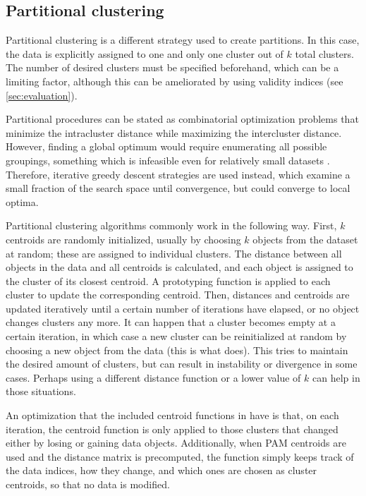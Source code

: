 \subsection{Partitional clustering}
\label{sec:pc}

Partitional clustering is a different strategy used to create partitions.
In this case, the data is explicitly assigned to one and only one cluster out of $k$ total clusters.
The number of desired clusters must be specified beforehand,
which can be a limiting factor,
although this can be ameliorated by using validity indices (see \cref{sec:evaluation}).

Partitional procedures can be stated as combinatorial optimization problems that minimize the intracluster distance while maximizing the intercluster distance.
However, finding a global optimum would require enumerating all possible groupings,
something which is infeasible even for relatively small datasets \citep{hastie2009}.
Therefore, iterative greedy descent strategies are used instead,
which examine a small fraction of the search space until convergence,
but could converge to local optima.

Partitional clustering algorithms commonly work in the following way.
First, $k$ centroids are randomly initialized,
usually by choosing $k$ objects from the dataset at random;
these are assigned to individual clusters.
The distance between all objects in the data and all centroids is calculated,
and each object is assigned to the cluster of its closest centroid.
A prototyping function is applied to each cluster to update the corresponding centroid.
Then, distances and centroids are updated iteratively until a certain number of iterations have elapsed,
or no object changes clusters any more.
It can happen that a cluster becomes empty at a certain iteration,
in which case a new cluster can be reinitialized at random by choosing a new object from the data
(this is what \dtwclust{} does).
This tries to maintain the desired amount of clusters,
but can result in instability or divergence in some cases.
Perhaps using a different distance function or a lower value of $k$ can help in those situations.

An optimization that the included centroid functions in \dtwclust{} have is that,
on each iteration,
the centroid function is only applied to those clusters that changed either by losing or gaining data objects.
Additionally, when PAM centroids are used and the distance matrix is precomputed,
the function simply keeps track of the data indices,
how they change,
and which ones are chosen as cluster centroids,
so that no data is modified.

